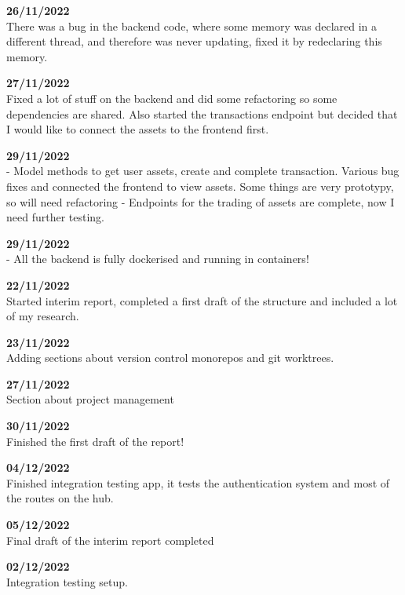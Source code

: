 \documentclass[titlepage]{article}
\begin{document}
\textbf{26/11/2022} \\
There was a bug in the backend code, where some memory was declared in a different thread, and therefore was never updating, fixed it by redeclaring this memory.

\textbf{27/11/2022} \\
Fixed a lot of stuff on the backend and did some refactoring so some dependencies are shared. Also started the transactions endpoint but decided that I would like to connect the assets to the frontend first.

\textbf{29/11/2022} \\
 - Model methods to get user assets, create and complete transaction. Various bug fixes and connected the frontend to view assets. Some things are very prototypy, so will need refactoring
 - Endpoints for the trading of assets are complete, now I need further testing.

\textbf{29/11/2022} \\
 - All the backend is fully dockerised and running in containers!

\textbf{22/11/2022} \\
Started interim report, completed a first draft of the structure and included a lot of my research.

\textbf{23/11/2022} \\
Adding sections about version control monorepos and git worktrees.

\textbf{27/11/2022} \\
Section about project management

\textbf{30/11/2022} \\
Finished the first draft of the report!

\textbf{04/12/2022} \\
Finished integration testing app, it tests the authentication system and most of the routes on the hub.

\textbf{05/12/2022} \\
Final draft of the interim report completed

\textbf{02/12/2022} \\
Integration testing setup.
\end{document}
